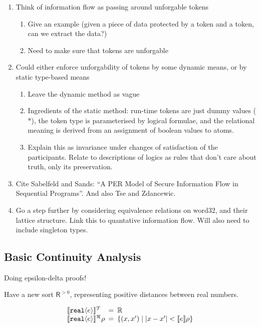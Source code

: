 \begin{enumerate}
\item Think of information flow as passing around unforgable tokens
  \begin{enumerate}
  \item Give an example (given a piece of data protected by a token
    and a token, can we extract the data?)
  \item Need to make sure that tokens are unforgable
  \end{enumerate}
\item Could either enforce unforgability of tokens by some dynamic
  means, or by static type-based means
  \begin{enumerate}
  \item Leave the dynamic method as vague
  \item Ingredients of the static method: run-time tokens are just
    dummy values ($*$), the token type is parameterised by logical
    formulae, and the relational meaning is derived from an assignment
    of boolean values to atoms.
  \item Explain this as invariance under changes of satisfaction of
    the participants. Relate to descriptions of logics as rules that
    don't care about truth, only its preservation.
  \end{enumerate}
\item Cite Sabelfeld and Sands: ``A PER Model of Secure Information
  Flow in Sequential Programs''. And also Tse and Zdancewic.
\item Go a step further by considering equivalence relations on
  word32, and their lattice structure. Link this to quantative
  information flow. Will also need to include singleton types.
\end{enumerate}

\subsection{Basic Continuity Analysis}
\label{sec:continuity-analysis}

Doing epsilon-delta proofs!

Have a new sort $\mathsf{R}^{>0}$, representing positive distances
between real numbers.

\begin{displaymath}
  \begin{array}{l@{\hspace{0.5em}=\hspace{0.5em}}l}
    \tySem{\tyPrim{real}{e}} & \mathbb{R} \\
    \rsem{\tyPrim{real}{e}}{}\rho & \{ (x,x') \sepbar |x-x'| < \sem{e}\rho \}
  \end{array}
\end{displaymath}

